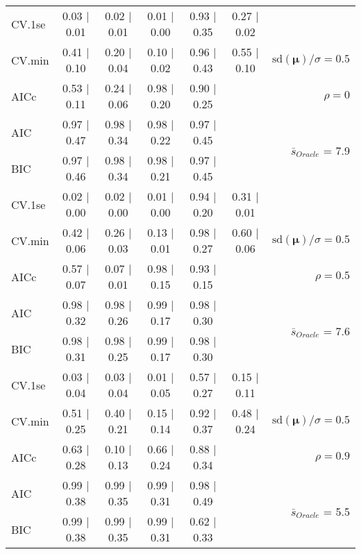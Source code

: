\begin{table}
\begin{center}
\begin{tabular}{l*{5}{c}|r}
 \hline 
CV.1se & 0.03 $\mid$ 0.01 & 0.02 $\mid$ 0.01 & 0.01 $\mid$ 0.00 & 0.93 $\mid$ 0.35 & 0.27 $\mid$ 0.02 & \\
CV.min & 0.41 $\mid$ 0.10 & 0.20 $\mid$ 0.04 & 0.10 $\mid$ 0.02 & 0.96 $\mid$ 0.43 & 0.55 $\mid$ 0.10 &  $\mathrm{sd}(\mathbf{\mu})/\sigma=0.5$ \\
AICc & 0.53 $\mid$ 0.11 & 0.24 $\mid$ 0.06 & 0.98 $\mid$ 0.20 & 0.90 $\mid$ 0.25 & & $\rho=0$ \\
AIC & 0.97 $\mid$ 0.47 & 0.98 $\mid$ 0.34 & 0.98 $\mid$ 0.22 & 0.97 $\mid$ 0.45 & &  \multirow{2}{*}{$\bar{s}_{Oracle}$ = 7.9} \\
BIC & 0.97 $\mid$ 0.46 & 0.98 $\mid$ 0.34 & 0.98 $\mid$ 0.21 & 0.97 $\mid$ 0.45 & &  \\
 \hline 
CV.1se & 0.02 $\mid$ 0.00 & 0.02 $\mid$ 0.00 & 0.01 $\mid$ 0.00 & 0.94 $\mid$ 0.20 & 0.31 $\mid$ 0.01 & \\
CV.min & 0.42 $\mid$ 0.06 & 0.26 $\mid$ 0.03 & 0.13 $\mid$ 0.01 & 0.98 $\mid$ 0.27 & 0.60 $\mid$ 0.06 &  $\mathrm{sd}(\mathbf{\mu})/\sigma=0.5$ \\
AICc & 0.57 $\mid$ 0.07 & 0.07 $\mid$ 0.01 & 0.98 $\mid$ 0.15 & 0.93 $\mid$ 0.15 & & $\rho=0.5$ \\
AIC & 0.98 $\mid$ 0.32 & 0.98 $\mid$ 0.26 & 0.99 $\mid$ 0.17 & 0.98 $\mid$ 0.30 & &  \multirow{2}{*}{$\bar{s}_{Oracle}$ = 7.6} \\
BIC & 0.98 $\mid$ 0.31 & 0.98 $\mid$ 0.25 & 0.99 $\mid$ 0.17 & 0.98 $\mid$ 0.30 & &  \\
 \hline 
CV.1se & 0.03 $\mid$ 0.04 & 0.03 $\mid$ 0.04 & 0.01 $\mid$ 0.05 & 0.57 $\mid$ 0.27 & 0.15 $\mid$ 0.11 & \\
CV.min & 0.51 $\mid$ 0.25 & 0.40 $\mid$ 0.21 & 0.15 $\mid$ 0.14 & 0.92 $\mid$ 0.37 & 0.48 $\mid$ 0.24 &  $\mathrm{sd}(\mathbf{\mu})/\sigma=0.5$ \\
AICc & 0.63 $\mid$ 0.28 & 0.10 $\mid$ 0.13 & 0.66 $\mid$ 0.24 & 0.88 $\mid$ 0.34 & & $\rho=0.9$ \\
AIC & 0.99 $\mid$ 0.38 & 0.99 $\mid$ 0.35 & 0.99 $\mid$ 0.31 & 0.98 $\mid$ 0.49 & &  \multirow{2}{*}{$\bar{s}_{Oracle}$ = 5.5} \\
BIC & 0.99 $\mid$ 0.38 & 0.99 $\mid$ 0.35 & 0.99 $\mid$ 0.31 & 0.62 $\mid$ 0.33 & &  \\
 \hline 
\end{tabular}
\end{center}
\vspace{-1cm}
\end{table}




